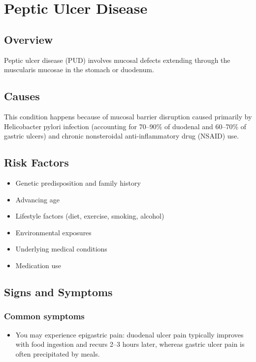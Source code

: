 \chapter{Peptic Ulcer Disease}
\label{sec:Peptic Ulcer Disease}

\section{Overview}
Peptic ulcer disease (PUD) involves mucosal defects extending through the muscularis mucosae in the stomach or duodenum.
\section{Causes}
This condition happens because of mucosal barrier disruption caused primarily by Helicobacter pylori infection (accounting for 70--90\% of duodenal and 60--70\% of gastric ulcers) and chronic nonsteroidal anti-inflammatory drug (NSAID) use.     
\section{Risk Factors}

\begin{itemize}[noitemsep]
  \item Genetic predisposition and family history
  \item Advancing age
  \item Lifestyle factors (diet, exercise, smoking, alcohol)
  \item Environmental exposures
  \item Underlying medical conditions
  \item Medication use
\end{itemize}
\section{Signs and Symptoms}

\subsection{Common symptoms}
\begin{itemize}[noitemsep]
  \item You may experience epigastric pain: duodenal ulcer pain typically improves with food ingestion and recurs 2--3 hours later, whereas gastric ulcer pain is often precipitated by meals. 
  \end{itemize}

